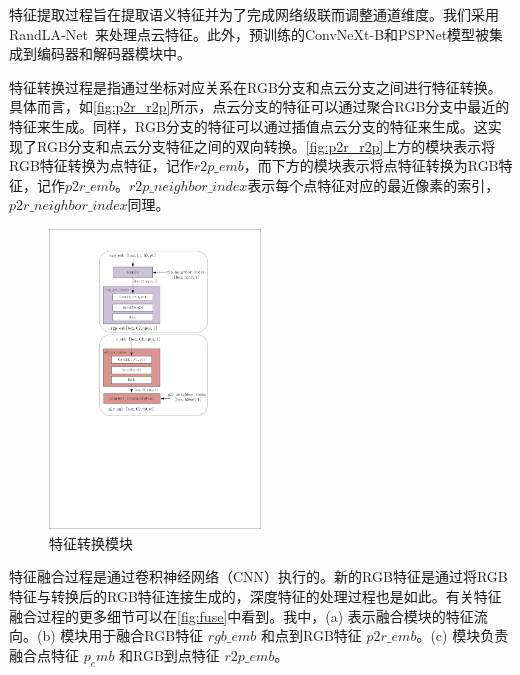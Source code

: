 特征提取过程旨在提取语义特征并为了完成网络级联而调整通道维度。我们采用RandLA-Net~\cite{hu2020randla}来处理点云特征。此外，预训练的ConvNeXt-B\cite{Liu2022ACF}和PSPNet\cite{zhao2017pyramid}模型被集成到编码器和解码器模块中。

特征转换过程是指通过坐标对应关系在RGB分支和点云分支之间进行特征转换。具体而言，如\autoref{fig:p2r_r2p}所示，点云分支的特征可以通过聚合RGB分支中最近的特征来生成。同样，RGB分支的特征可以通过插值点云分支的特征来生成。这实现了RGB分支和点云分支特征之间的双向转换。\autoref{fig:p2r_r2p}上方的模块表示将RGB特征转换为点特征，记作$r2p\_emb$，而下方的模块表示将点特征转换为RGB特征，记作$p2r\_emb$。$r2p\_neighbor\_index$表示每个点特征对应的最近像素的索引，$p2r\_neighbor\_index$同理。

\begin{figure}[htbp]
    \centering
    \includegraphics[width=0.5\textwidth]{figure/hipose/p2r_r2p.pdf}
    \caption{特征转换模块}
    \label{fig:p2r_r2p}
\end{figure}

特征融合过程是通过卷积神经网络（CNN）执行的。新的RGB特征是通过将RGB特征与转换后的RGB特征连接生成的，深度特征的处理过程也是如此。有关特征融合过程的更多细节可以在\autoref{fig:fuse}中看到。我中，(a) 表示融合模块的特征流向。(b) 模块用于融合RGB特征 $rgb\_emb$ 和点到RGB特征 $p2r\_emb$。(c) 模块负责融合点特征 $p_emb$ 和RGB到点特征 $r2p\_emb$。

